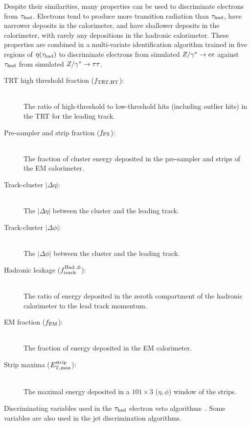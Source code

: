 Despite their similarities, many properties can be used to discriminate electrons from $\tau_\text{had}$. Electrons tend to produce more transition radiation than $\tau_\text{had}$, have narrower deposits in the calorimeter, and have shallower deposits in the calorimeter, with rarely any depositions in the hadronic calorimeter. These properties are combined in a multi-variate identification algorithm trained in five regions of $\eta(\tauh)$ to discriminate electrons from simulated $Z/\gamma^\ast \rightarrow ee$ against $\tau_\text{had}$ from simulated $Z/\gamma^\ast \rightarrow \tau\tau$.
%
\begin{description}
    \item[TRT high threshold fraction ($f_\mathrm{TRT,HT}$):] \hfill \\
      The ratio of high-threshold to low-threshold hits (including outlier hits) in the TRT for the leading track.
    \item[Pre-sampler and strip fraction ($f_\mathrm{PS}$):] \hfill \\
      The fraction of cluster energy deposited in the pre-sampler and strips of the EM calorimeter.
    \item[Track-cluster $|\Delta\eta|$:] \hfill \\
      The $|\Delta\eta|$ between the cluster and the leading track.
    \item[Track-cluster $|\Delta\phi|$:] \hfill \\
      The $|\Delta\phi|$ between the cluster and the leading track.
    \item[Hadronic leakage ($f^\mathrm{Had.,0}_{\mathrm{track}}$):] \hfill \\
      The ratio of energy deposited in the zeroth compartment of the hadronic calorimeter to the lead track momentum.
    \item[EM fraction ($f_\mathrm{EM}$):] \hfill \\
      The fraction of energy deposited in the EM calorimeter.
    \item[Strip maxima ($E_\mathrm{T,max}^\mathrm{strip}$):] \hfill \\
      The maximal energy deposited in a $101 \!\times\! 3$ ($\eta, \phi$) window of the strips.
\end{description}
%
\begin{table}[htp] 
  \centering
  \renewcommand{\arraystretch}{1.4}
  \caption{Discriminating variables used in the $\tau_\text{had}$ electron veto algorithms~\cite{PERF-2013-06,ATLAS-CONF-2013-064,ATLAS-CONF-2012-142}. Some variables are also used in the jet discrimination algorithms.}
  
  \label{tab:taus-evetovars}
\end{table}


